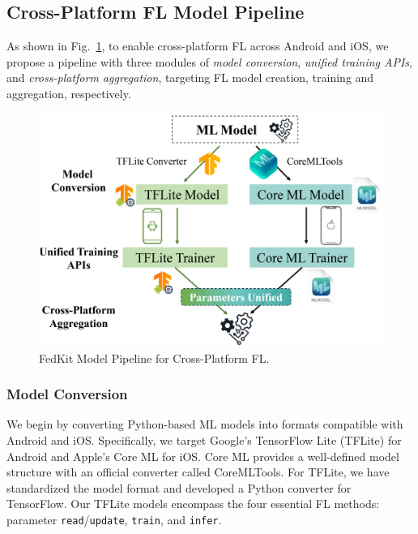 \documentclass[letterpaper]{article} %
\begin{document}
\subsection{Cross-Platform FL Model Pipeline}

As shown in Fig.~\ref{cross_fl},
to enable cross-platform FL across Android and iOS,
we propose a pipeline with three modules of
\textit{model conversion},
\textit{unified training APIs},
and \textit{cross-platform aggregation},
targeting FL model creation, training and aggregation, respectively.

\begin{figure}
    \centering
    \includegraphics*[width=\linewidth]{cross_smart_fl_workflow.pdf}
    \caption{FedKit Model Pipeline for Cross-Platform FL.}
    \label{cross_fl}
\end{figure}

\subsubsection{Model Conversion}
We begin by converting Python-based ML models into formats compatible with
Android and iOS.
Specifically, we target Google's TensorFlow Lite (TFLite) for Android and
Apple's Core ML for iOS.
Core ML provides a well-defined model structure with
an official converter called CoreMLTools.
For TFLite, we have standardized the model format and
developed a Python converter for TensorFlow.
Our TFLite models encompass the four essential FL methods:
parameter \texttt{read}/\texttt{update}, \texttt{train}, and \texttt{infer}.
\end{document}

